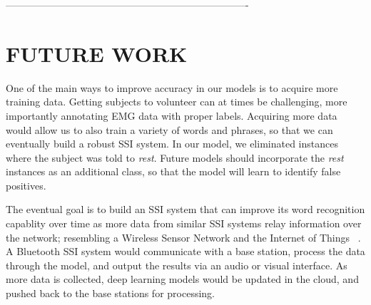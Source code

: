 \documentclass{article}
\begin{document}
 -------------------------------------------------------------------------

%


\section{FUTURE WORK}
\label{sec:FUTURE WORK}

One of the main ways to improve accuracy in our models is to acquire more training data. Getting subjects to volunteer can at times be challenging, more importantly annotating EMG data with proper labels. Acquiring more data would allow us to also train a variety of words and phrases, so that we can eventually build a robust SSI system. In our model, we eliminated instances where the subject was told to \textit{rest}. Future models should incorporate the \textit{rest} instances as an additional class, so that the model will learn to identify false positives.

The eventual goal is to build an SSI system that can improve its word recognition capablity over time as more data from similar SSI systems relay information over the network; resembling a Wireless Sensor Network and the Internet of Things ~\cite{ferdoush_wireless_2014}. A Bluetooth SSI system would communicate with a base station, process the data through the model, and output the results via an audio or visual interface. As more data is collected, deep learning models would be updated in the cloud, and pushed back to the base stations for processing.
\end{document}

